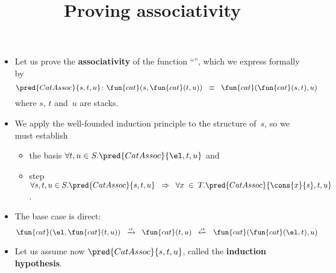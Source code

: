 \documentclass[wide]{slides}
\begin{document}
\begin{slide}
  \title{Proving associativity}

  \begin{itemize}

    \item Let us prove the \textbf{associativity} of the function
      ``'', which we express formally by
      \begin{equation*}
        \pred{CatAssoc}{s,t,u} \colon \fun{cat}(s,\fun{cat}(t,u))
        \;\; \equiv \;\; \fun{cat}(\fun{cat}(s,t),u)
      \end{equation*}
      where \(s\), \(t\) and~\(u\) are stacks.

    \item We apply the well\hyp{}founded induction principle to the
      structure of~\(s\), so we must establish
      \begin{itemize}

        \item the basis \(\forall t,u \in S.\pred{CatAssoc}{\el,t,u}\)
          and

        \item step \(\forall s,t,u \in S.\pred{CatAssoc}{s,t,u} \;\;
          \Rightarrow \;\; \forall x \; \in \;
          T.\pred{CatAssoc}{\cons{x}{s},t,u}\).

      \end{itemize}

    \item The base case is direct:
      \begin{equation*}
        \fun{cat}(\el,\fun{cat}(t,u)) \;\; \xrightarrow{\alpha} \;\;
        \fun{cat}(t,u) \;\; \xleftarrow{\alpha} \;\;
        \fun{cat}(\fun{cat}(\el,t),u)
      \end{equation*}

    \item Let us assume now \(\pred{CatAssoc}{s,t,u}\), called the
      \textbf{induction hypothesis}.

  \end{itemize}

\end{slide}
\end{document}
